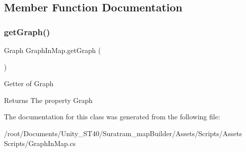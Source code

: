 \subsection{Member Function Documentation}
\mbox{\label{classGraphInMap_a399e9c51b1492837c7d71b9a729a84ad}} 
\subsubsection{\texorpdfstring{get\+Graph()}{getGraph()}}
{\footnotesize\ttfamily Graph Graph\+In\+Map.\+get\+Graph (\begin{DoxyParamCaption}{ }\end{DoxyParamCaption})\hspace{0.3cm}{\ttfamily [inline]}}



Getter of {\ttfamily Graph} 

\begin{DoxyReturn}{Returns}
The property {\ttfamily Graph}
\end{DoxyReturn}


The documentation for this class was generated from the following file\+:\begin{DoxyCompactItemize}
\item 
/root/\+Documents/\+Unity\+\_\+\+S\+T40/\+Suratram\+\_\+map\+Builder/\+Assets/\+Scripts/\+Assets Scripts/Graph\+In\+Map.\+cs\end{DoxyCompactItemize}
